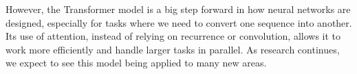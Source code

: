 \documentclass[runningheads]{llncs}
\begin{document}
However, the Transformer model is a big step forward in how neural networks are designed, especially for tasks where we need to convert one sequence into another. Its use of attention, instead of relying on recurrence or convolution, allows it to work more efficiently and handle larger tasks in parallel. As research continues, we expect to see this model being applied to many new areas.




\end{document}
